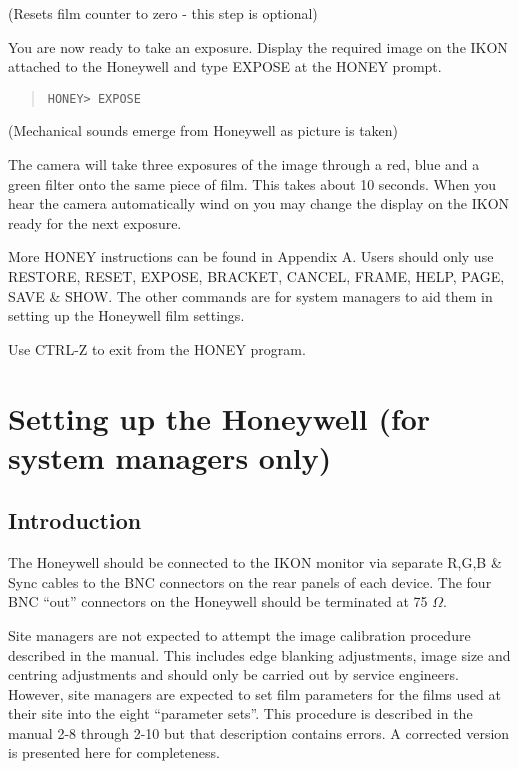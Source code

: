 (Resets film counter to zero - this step is optional)

You are now ready to take an exposure. Display the required image on the
IKON attached to the Honeywell and type EXPOSE at the HONEY prompt.

\begin{quote}
\begin{verbatim}
HONEY> EXPOSE
\end{verbatim}
\end{quote}

(Mechanical sounds emerge from Honeywell as picture is taken)

The
camera will take three exposures of the image through a red, blue and a green
filter onto the same piece of film. This takes about 10 seconds. When you hear
the camera automatically wind on you may change the display on the IKON
ready for the next exposure.

More HONEY instructions can be found in Appendix A. Users should only use
RESTORE, RESET, EXPOSE, BRACKET, CANCEL, FRAME, HELP, PAGE, SAVE \&
SHOW. The other
commands are for system managers to aid them in setting up the Honeywell
film settings.

Use CTRL-Z to exit from the HONEY program.

\section{Setting up the Honeywell (for system managers only)}

\subsection{Introduction}

The Honeywell should be connected to the IKON monitor via separate R,G,B \&
Sync cables to the BNC connectors on the rear panels of each device. The four
BNC ``out'' connectors on the Honeywell should be terminated at 75 $\Omega$.

Site managers are not expected to attempt the image calibration procedure
described in the manual. This  includes edge blanking adjustments, image size
and centring adjustments and should only be carried out by service engineers.
However, site managers are expected to set film parameters for the films used
at their site into the eight ``parameter sets''. This procedure is
described in the manual 2-8 through 2-10 but that
description contains errors. A corrected version is presented here for
completeness.

